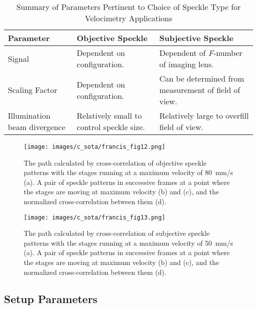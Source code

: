    \begin{table}[h]
        \centering
        \footnotesize
        \begin{tabular}{|p{4cm}|p{5cm}|p{5cm}|}
            \hline
            Parameter & Objective Speckle & Subjective Speckle \\
            \hline
            Signal    & Dependent on configuration. & Dependent of \emph{F}-number of imaging lens. \\
            \hline
            Scaling Factor  & Dependent on configuration. & Can be determined from measurement of field of view. \\
            \hline
            Illumination beam divergence & Relatively small to control speckle size. & Relatively large to overfill field of view. \\
            \hline
        \end{tabular}
        \caption{Summary of Parameters Pertinent to Choice of Speckle Type for Velocimetry Applications \cite{francis_autonomous}}
        \label{table:francis_table1}
        
    \end{table}
    
    \begin{figure}[h]
        \centering
        \texttt{[image: images/c\_sota/francis\_fig12.png]}
        \caption{The path calculated by cross-correlation of objective speckle patterns with the stages running at a maximum velocity of \SI{80}{\milli\meter/\second} (a). A pair of speckle patterns in successive frames at a point where the stages are moving at maximum velocity (b) and (c), and the normalized cross-correlation between them (d).\cite{francis_autonomous}}
        \label{fig:francis_fig12}
    \end{figure}

    \begin{figure}[h]
        \centering
        \texttt{[image: images/c\_sota/francis\_fig13.png]}
        \caption{The path calculated by cross-correlation of subjective speckle patterns with the stages running at a maximum velocity of \SI{50}{\milli\meter/\second} (a). A pair of speckle patterns in successive frames at a point where the stages are moving at maximum velocity (b) and (c), and the normalized cross-correlation between them (d). \cite{francis_autonomous}}
        \label{fig:francis_fig13}
    \end{figure}
\clearpage

\subsection{Setup Parameters}

